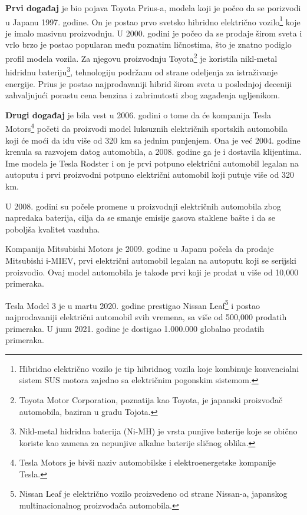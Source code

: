 \documentclass[a4paper]{article}
\begin{document}
\textbf{Prvi događaj} je bio pojava Toyota Prius-a, modela koji je počeo da se porizvodi u Japanu 1997. godine. On je postao prvo svetsko hibridno električno vozilo\footnote{Hibridno električno vozilo je tip hibridnog vozila koje kombinuje konvencialni sistem SUS motora zajedno sa električnim pogonskim sistemom.} koje je imalo masivnu proizvodnju. U 2000. godini je počeo da se prodaje širom sveta i vrlo brzo je postao popularan među poznatim ličnostima, što je znatno podiglo profil modela vozila. Za njegovu proizvodnju Toyota\footnote{Toyota Motor Corporation, poznatija kao Toyota, je japanski proizvođač automobila, baziran u gradu Tojota.} je koristila nikl-metal hidridnu bateriju\footnote{Nikl-metal hidridna baterija (Ni-MH) je vrsta punjive baterije koje se obično koriste kao zamena za nepunjive alkalne baterije sličnog oblika.}, tehnologiju podržanu od strane odeljenja za istraživanje energije. Prius je postao najprodavaniji hibrid širom sveta u poslednjoj deceniji zahvaljujući porastu cena benzina i zabrinutosti zbog zagađenja ugljenikom.

\textbf{Drugi događaj} je bila vest u 2006. godini o tome da će kompanija Tesla Motors\footnote{Tesla Motors je bivši naziv automobilske i elektroenergetske kompanije Tesla.} početi da proizvodi model luksuznih električnih sportskih automobila koji će moći da idu više od 320 km sa jednim punjenjem. Ona je već 2004. godine krenula  sa razvojem datog automobila, a 2008. godine ga je i dostavila klijentima. Ime modela je Tesla Rodster i on je prvi potpuno električni automobil legalan na autoputu i prvi proizvodni potpuno električni automobil koji putuje više od 320 km.

U 2008. godini su počele promene u proizvodnji električnih automobila zbog napredaka baterija, cilja da se smanje emisije gasova staklene bašte i da se poboljša kvalitet vazduha.

Kompanija Mitsubishi Motors je 2009. godine u Japanu počela da prodaje Mitsubishi i-MIEV, prvi električni automobil legalan na autoputu koji se serijski proizvodio. Ovaj model automobila je takođe prvi koji je prodat u više od 10,000 primeraka.

Tesla Model 3 je u martu 2020. godine prestigao Nissan Leaf\footnote{Nissan Leaf je električno vozilo proizvedeno od strane Nissan-a, japanskog multinacionalnog proizvođača automobila.} i postao najprodavaniji električni automobil svih vremena, sa više od 500,000 prodatih primeraka. U junu 2021. godine je dostigao 1.000.000 globalno prodatih primeraka.
\cite{istorija}
 
\end{document}
